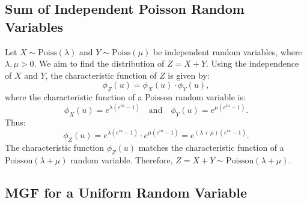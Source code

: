     \subsection{Sum of Independent Poisson Random Variables}
    Let \( X \sim \text{Poiss}(\lambda) \) and \( Y \sim \text{Poiss}(\mu) \) be independent random variables, where \( \lambda, \mu > 0 \). We aim to find the distribution of \( Z = X + Y \). \newline
    Using the independence of \( X \) and \( Y \), the characteristic function of \( Z \) is given by:
    \[
    \phi_Z(u) = \phi_X(u) \cdot \phi_Y(u),
    \]
    where the characteristic function of a Poisson random variable is:
    \[
    \phi_X(u) = e^{\lambda (e^{iu} - 1)} \quad \text{and} \quad \phi_Y(u) = e^{\mu (e^{iu} - 1)}.
    \]
    Thus:
    \[
    \phi_Z(u) = e^{\lambda (e^{iu} - 1)} \cdot e^{\mu (e^{iu} - 1)} = e^{(\lambda + \mu)(e^{iu} - 1)}.
    \]
    The characteristic function \( \phi_Z(u) \) matches the characteristic function of a \( \text{Poisson}(\lambda + \mu) \) random variable. Therefore, \( Z = X + Y \sim \text{Poisson}(\lambda + \mu) \).
    
    \subsection{MGF for a Uniform Random Variable}
    
